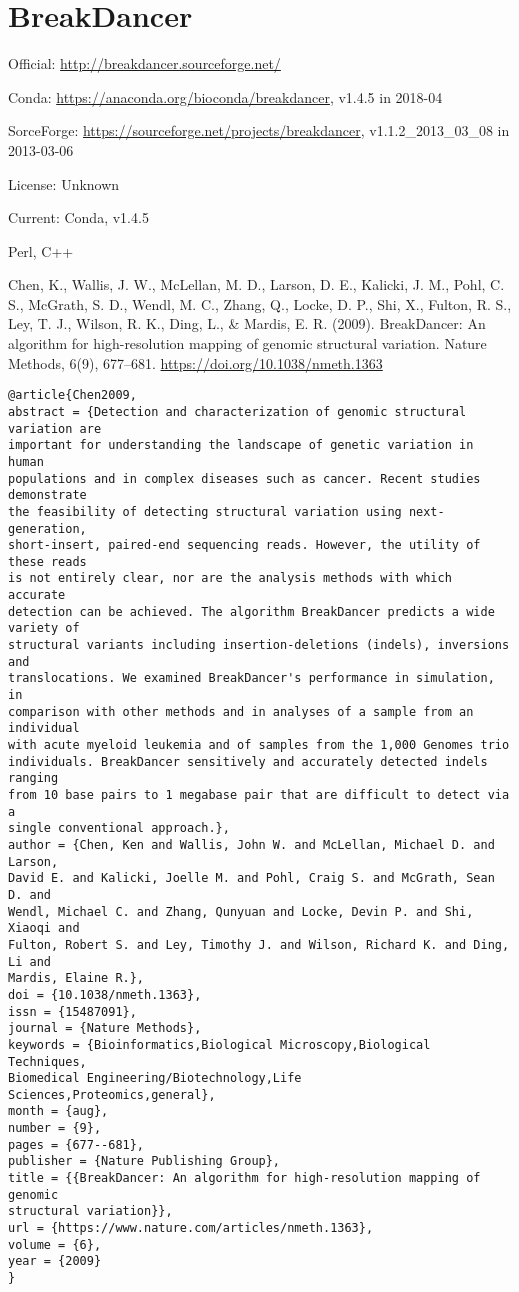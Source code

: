 \documentclass[]{article}
\begin{document}
\section{BreakDancer}

Official: \url{http://breakdancer.sourceforge.net/}

Conda: \url{https://anaconda.org/bioconda/breakdancer}, v1.4.5 in 2018-04

SorceForge: \url{https://sourceforge.net/projects/breakdancer}, v1.1.2\_2013\_03\_08 in 2013-03-06

License: Unknown

Current: Conda, v1.4.5

Perl, C++

Chen, K., Wallis, J. W., McLellan, M. D., Larson, D. E., Kalicki, J. M., Pohl, C. S., McGrath, S. D., Wendl, M. C., Zhang, Q., Locke, D. P., Shi, X., Fulton, R. S., Ley, T. J., Wilson, R. K., Ding, L., \& Mardis, E. R. (2009). BreakDancer: An algorithm for high-resolution mapping of genomic structural variation. Nature Methods, 6(9), 677–681. \url{https://doi.org/10.1038/nmeth.1363}

\begin{verbatim}
@article{Chen2009,
abstract = {Detection and characterization of genomic structural variation are
important for understanding the landscape of genetic variation in human
populations and in complex diseases such as cancer. Recent studies demonstrate
the feasibility of detecting structural variation using next-generation,
short-insert, paired-end sequencing reads. However, the utility of these reads
is not entirely clear, nor are the analysis methods with which accurate
detection can be achieved. The algorithm BreakDancer predicts a wide variety of
structural variants including insertion-deletions (indels), inversions and
translocations. We examined BreakDancer's performance in simulation, in
comparison with other methods and in analyses of a sample from an individual
with acute myeloid leukemia and of samples from the 1,000 Genomes trio
individuals. BreakDancer sensitively and accurately detected indels ranging
from 10 base pairs to 1 megabase pair that are difficult to detect via a
single conventional approach.},
author = {Chen, Ken and Wallis, John W. and McLellan, Michael D. and Larson,
David E. and Kalicki, Joelle M. and Pohl, Craig S. and McGrath, Sean D. and
Wendl, Michael C. and Zhang, Qunyuan and Locke, Devin P. and Shi, Xiaoqi and
Fulton, Robert S. and Ley, Timothy J. and Wilson, Richard K. and Ding, Li and
Mardis, Elaine R.},
doi = {10.1038/nmeth.1363},
issn = {15487091},
journal = {Nature Methods},
keywords = {Bioinformatics,Biological Microscopy,Biological Techniques,
Biomedical Engineering/Biotechnology,Life Sciences,Proteomics,general},
month = {aug},
number = {9},
pages = {677--681},
publisher = {Nature Publishing Group},
title = {{BreakDancer: An algorithm for high-resolution mapping of genomic
structural variation}},
url = {https://www.nature.com/articles/nmeth.1363},
volume = {6},
year = {2009}
}
\end{verbatim}
\end{document}
